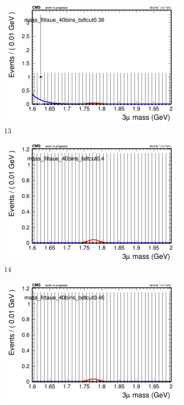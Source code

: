 \begin{figure}[h!]
\begin{subfigure}{0.2\textwidth}
        \includegraphics[width=\textwidth]{power_law/plots/taue/massfit_taue_40bins_bdtcut0.36.png}
        \caption{13}
    \end{subfigure}
    \begin{subfigure}{0.2\textwidth}
        \includegraphics[width=\textwidth]{power_law/plots/taue/massfit_taue_40bins_bdtcut0.4.png}
        \caption{14}
    \end{subfigure}
    \begin{subfigure}{0.2\textwidth}
        \includegraphics[width=\textwidth]{power_law/plots/taue/massfit_taue_40bins_bdtcut0.46.png}

\end{subfigure}
\end{figure}
